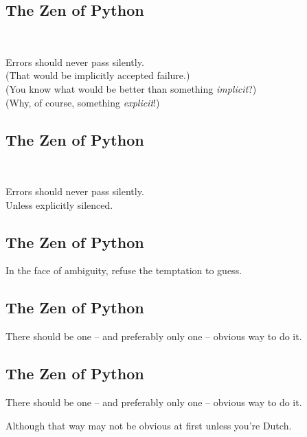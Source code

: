 \documentclass[xga]{xdvislides}
\begin{document}
\subsection{The Zen of Python}
\\
\begin{center}
    Errors should never pass silently. \\
\addvspace{.2in}
	\small
	(That would be implicitly accepted failure.) \\
\addvspace{.2in}
	(You know what would be better than something {\em implicit}?) \\
\addvspace{.2in}
	(Why, of course, something {\em explicit}!)
\end{center}

\subsection{The Zen of Python}
\\
\begin{center}
    Errors should never pass silently. \\
\addvspace{.5in}
    Unless explicitly silenced.
\end{center}

\subsection{The Zen of Python}
\begin{center}
    In the face of ambiguity, refuse the temptation to guess.
\end{center}

\subsection{The Zen of Python}
\begin{center}
    There should be one -- and preferably only one -- obvious way to do it.
\end{center}

\subsection{The Zen of Python}
\begin{center}
    There should be one -- and preferably only one -- obvious way to do it.

\addvspace{.5in}

    Although that way may not be obvious at first unless you're Dutch. \\
\end{center}
\end{document}
